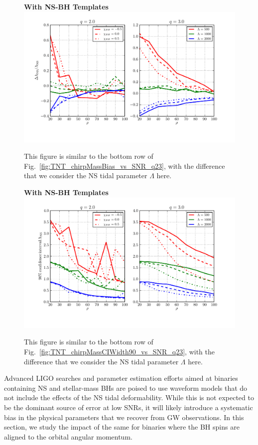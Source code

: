 \documentclass[aps,prd,amsmath,floats,floatfix, twocolumn,
superscriptaddress,nofootinbib,showpacs]{revtex4-1}
\begin{document}
\begin{figure}
\centering
\textbf{With NS-BH Templates}
\includegraphics[width=2\columnwidth]{plots/TT_NSLambdaBias_vs_SNR_q23.pdf}
\caption{This figure is similar to the bottom row of
Fig.~\ref{fig:TNT_chirpMassBias_vs_SNR_q23}, with the difference that  we
consider the NS tidal parameter $\Lambda$ here.}
\label{fig:TT_NSLambdaBias_vs_SNR_q23}
\end{figure}
% 
\begin{figure}
	\centering
	\textbf{With NS-BH Templates}
	\includegraphics[width=2\columnwidth]{plots/TT_NSLambdaCIWidth90_vs_SNR_q23.pdf}
	\caption{This figure is similar to the bottom row of
		Fig.~\ref{fig:TNT_chirpMassCIWidth90_vs_SNR_q23}, with the difference that  we
		consider the NS tidal parameter $\Lambda$ here.}
	\label{fig:TT_NSLambdaCIWidth90_vs_SNR_q23}
\end{figure}
% 
% 
Advanced LIGO searches and parameter estimation efforts aimed at binaries 
containing NS and stellar-mass BHs are poised to use waveform models that do not
include the effects of the NS tidal deformability. While this is not expected to
be the dominant source of error at low SNRs, it will likely introduce a
systematic bias in the physical parameters that we recover from GW observations.
In this section, we study the impact of the same for binaries where the BH spins
are aligned to the orbital angular momentum.
\end{document}
